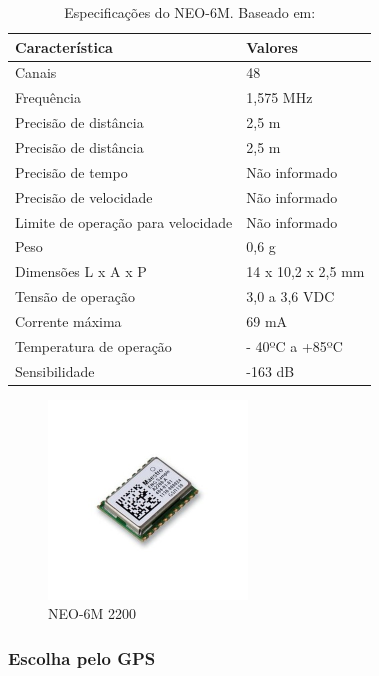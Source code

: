  \begin{table}[ht]
 \caption{Especificações do NEO-6M. Baseado em: \cite{15gps}}
 \centering
 \begin{tabular}{| l |  p{5cm} |}
 \hline
 Característica & Valores \\
 \hline
 Canais & 48 \\
 \hline
 Frequência & 1,575 MHz \\
 \hline
 Precisão de distância & 2,5 m \\
 \hline
 Precisão de distância & 2,5 m \\
 \hline
 Precisão de tempo & Não informado \\
 \hline
 Precisão de velocidade & Não informado \\
 \hline
 Limite de operação para velocidade & Não informado \\
 \hline
 Peso & 0,6 g \\
 \hline
 Dimensões L x A x P & 14 x 10,2 x 2,5 mm \\
 \hline
 Tensão de operação & 3,0 a 3,6 VDC \\
 \hline
 Corrente máxima & 69 mA \\
 \hline
 Temperatura de operação & - 40ºC a +85ºC \\
 \hline
 Sensibilidade & -163 dB \\
 \hline
 \end{tabular}
 \label{table:especificacao_gps_neo6m}
 \end{table}

 \begin{figure}[h]
   \centering
   \includegraphics[width=200px, scale=1]{figuras/gps_neo_6m}
   \caption{NEO-6M 2200  \cite{16gps}}
 \label{fig:gps_neo_6m}
 \end{figure}

\subsubsection{Escolha pelo GPS}


